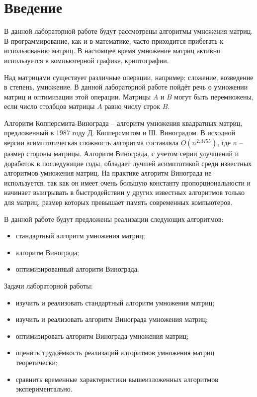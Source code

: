 \chapter*{Введение}

В данной лабораторной работе будут рассмотрены алгоритмы умножения матриц.
В программирование, как и в математике, часто приходится прибегать к использованию матриц.
В настоящее время умножение матриц активно используется в компьютерной графике, криптографии.

Над матрицами существует различные операции, например: сложение, возведение в степень, умножение.
В данной лабораторной работе пойдёт речь о умножении матриц и оптимизации этой операции.
Матрицы $A$ и $B$ могут быть перемножены, если число столбцов матрицы $A$ равно числу строк $B$.

Алгоритм Копперсмита-Винограда -- алгоритм умножения квадратных матриц, предложенный в 1987 году Д. Копперсмитом и Ш. Виноградом.
В исходной версии асимптотическая сложность алгоритма составляла $O(n^{2,3755})$, где $n$ -- размер стороны матрицы.
Алгоритм Винограда, с учетом серии улучшений и доработок в последующие годы, обладает лучшей асимптотикой среди известных алгоритмов умножения матриц.
На практике алгоритм Винограда не используется, так как он имеет очень большую константу пропорциональности и начинает выигрывать в быстродействии у других известных алгоритмов только для матриц, размер которых превышает память современных компьютеров.

В данной работе будут предложены реализации следующих алгоритмов:
\begin{itemize}
	\item стандартный алгоритм умножения матриц;
	\item алгоритм Винограда;
	\item оптимизированный алгоритм Винограда.
\end{itemize}

\clearpage

Задачи лабораторной работы:
\begin{itemize}
	\item изучить и реализовать стандартный алгоритм умножения матриц;
	\item изучить и реализовать алгоритм Винограда умножения матриц;
	\item оптимизировать алгоритм Винограда умножения матриц;
	\item оценить трудоёмкость реализаций алгоритмов умножения матриц теоретически;
	\item сравнить временные характеристики вышеизложенных алгоритмов экспериментально.
\end{itemize}
